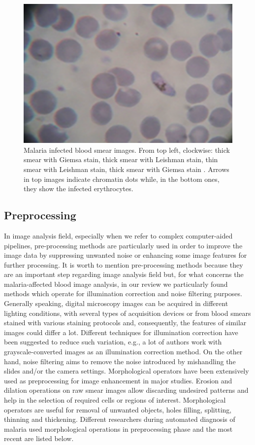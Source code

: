 \documentclass[sensors,review,submit,moreauthors,pdftex,10pt,a4paper]{mdpi}
\begin{document}
\begin{figure}[!t]
	\includegraphics[height=0.15\textheight]{img/f3_ThinLeishman}
	\caption{\label{fig:thick_thin_film}Malaria infected blood smear images. From top left, clockwise: thick smear with Giemsa stain, thick smear with Leishman stain, thin smear with Leishman stain, thick smear with Giemsa stain \cite{Das2015}. Arrows in top images indicate chromatin dots while, in the bottom ones, they show the infected erythrocytes.}
\end{figure}

\subsection{Preprocessing}
In image analysis field, especially when we refer to complex computer-aided pipelines, pre-processing methods are particularly used in order to improve the image data by suppressing unwanted noise or enhancing some image features for further processing.
It is worth to mention pre-processing methods because they are an important step regarding image analysis field but, for what concerns the malaria-affected blood image analysis, in our review we particularly found methods which operate for illumination correction and noise filtering purposes.
Generally speaking, digital microscopy images can be acquired in different lighting conditions, with several types of acquisition devices or from blood smears stained with various staining protocols and, consequently, the features of similar images could differ a lot.
Different techniques for illumination correction have been suggested to reduce such variation, e.g., a lot of authors work with grayscale-converted images as an illumination correction method. 
On the other hand, noise filtering aims to remove the noise introduced by mishandling the slides and/or the camera settings.
Morphological operators have been extensively used as preprocessing for image enhancement in major studies.
Erosion and dilation operations on raw smear images allow discarding undesired patterns and help in the selection of required cells or regions of interest. Morphological operators are useful for removal of unwanted
objects, holes filling, splitting, thinning and thickening. Different researchers during automated diagnosis of malaria used morphological operations in preprocessing phase and the most recent are listed below.
\end{document}
